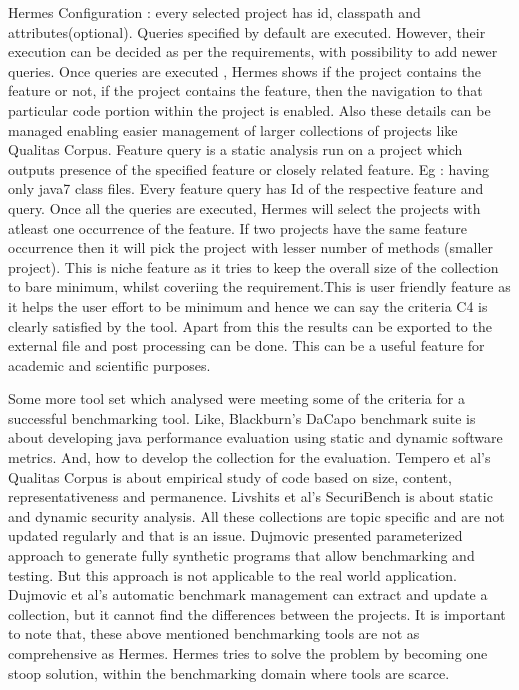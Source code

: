 \documentclass[authoryear,preprint]{sigplanconf}
\begin{document}
Hermes Configuration : every selected project has id, classpath and attributes(optional). Queries specified by default are executed. However, their execution can be decided as per the requirements, with possibility to add newer queries. Once queries are executed , Hermes shows if the project contains the feature or not, if the project contains the feature, then the navigation to that particular code portion within the project is enabled. Also these details can be managed enabling easier management of larger collections of projects like Qualitas Corpus. Feature query is a static analysis run on a project which outputs presence of the specified feature or closely related feature. Eg : having only java7 class files. Every feature query has Id of the respective feature and query. Once all the queries are executed, Hermes will select the projects with atleast one occurrence of the feature. If two projects have the same feature occurrence then it will pick the project with lesser number of methods (smaller project). This is niche feature as it tries to keep the overall size of the collection to bare minimum, whilst coveriing the requirement.This is user friendly feature as it helps the user effort to be minimum and hence we can say the criteria C4 is clearly satisfied by the tool. Apart from this the results can be exported to the external file and post processing can be done. This can be a useful feature for academic and scientific purposes.

Some more tool set which analysed were meeting some of the criteria for a successful benchmarking tool. Like, Blackburn’s DaCapo benchmark suite\cite{Blackburn:2006:DBJ:1167473.1167488} is about developing java performance evaluation using static and dynamic software metrics. And, how to develop the collection for the evaluation. Tempero et al’s Qualitas Corpus is about empirical study of code based on size, content, representativeness and permanence. Livshits et al’s SecuriBench\cite{Livshits_defininga} is about static and dynamic security analysis. All these collections are topic specific and are not updated regularly and that is an issue. Dujmovic presented parameterized approach to generate fully synthetic programs that allow benchmarking and testing. But this approach is not applicable to the real world application. Dujmovic et al’s automatic benchmark management\cite{Dujmovic:2010:AGB:1712605.1712654} can extract and update a collection, but it cannot find the differences between the projects. It is important to note that, these above mentioned benchmarking tools are not as comprehensive as Hermes. Hermes tries to solve the problem by becoming one stoop solution, within the benchmarking domain where tools are scarce.
\end{document}
